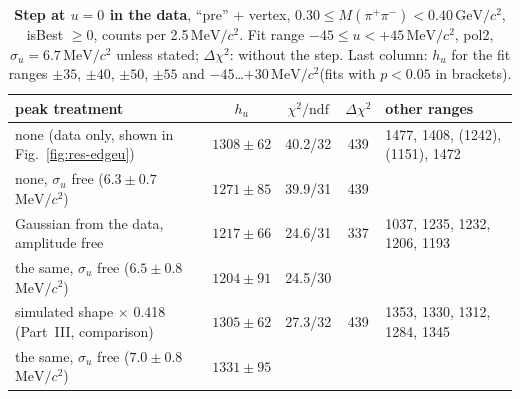\documentclass[11pt,a4paper]{article}
\newcommand{\Mpipi}{\ensuremath{M(\pi^{+}\pi^{-})}\xspace}
\newcommand{\GeVcc}{\ensuremath{\mathrm{GeV}/c^{2}}\xspace}
\newcommand{\MeVcc}{\ensuremath{\mathrm{MeV}/c^{2}}\xspace}
\begin{document}
\begin{table}[H]
\centering
\caption{\textbf{Step at $u=0$ in the data}, ``pre'' + vertex, $0.30\le\Mpipi<0.40$\,\GeVcc, isBest $\ge0$, counts per 2.5\,\MeVcc. Fit range
$-45\le u<+45$\,\MeVcc, pol2, $\sigma_u=6.7$\,\MeVcc unless stated; $\Delta\chi^2$: without the step. Last column: $h_u$ for the fit
ranges $\pm35$, $\pm40$, $\pm50$, $\pm55$ and $-45$\dots$+30$\,\MeVcc (fits with $p<0.05$ in brackets).}
\label{tab:edgeu}
\footnotesize
\begin{tabularx}{\textwidth}{@{}>{\raggedright\arraybackslash}p{4.4cm} c c c L@{}}
\toprule
peak treatment & $h_u$ & $\chi^2/\mathrm{ndf}$ & $\Delta\chi^2$ & other ranges \\
\midrule
none (data only, shown in Fig.~\ref{fig:res-edgeu}) & $1308\pm62$ & 40.2/32 & 439 & 1477, 1408, (1242), (1151), 1472 \\
none, $\sigma_u$ free ($6.3\pm0.7$\,\MeVcc) & $1271\pm85$ & 39.9/31 & 439 & \\
Gaussian from the data, amplitude free & $1217\pm66$ & 24.6/31 & 337 & 1037, 1235, 1232, 1206, 1193 \\
the same, $\sigma_u$ free ($6.5\pm0.8$\,\MeVcc) & $1204\pm91$ & 24.5/30 & & \\
simulated shape $\times$ 0.418 (Part~III, comparison) & $1305\pm62$ & 27.3/32 & 439 & 1353, 1330, 1312, 1284, 1345 \\
the same, $\sigma_u$ free ($7.0\pm0.8$\,\MeVcc) & $1331\pm95$ & & & \\
\bottomrule
\end{tabularx}
\end{table}
\end{document}
